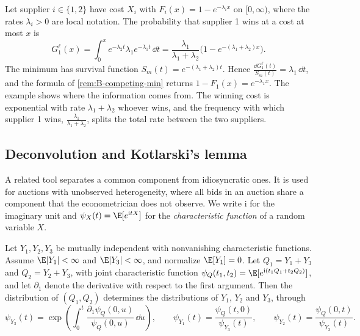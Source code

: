 \begin{example}\label{ex:B-competing-exp}
Let supplier $i \in \{1, 2\}$ have cost $X_i$ with $F_i(x) = 1 - e^{-\lambda_ix}$ on $[0, \infty)$, where the
rates $\lambda_i > 0$ are local notation. The probability that supplier 1 wins at a cost at most $x$ is
\begin{equation*}
  G_1^\ell(x) = \int_0^x e^{-\lambda_2t}\lambda_1e^{-\lambda_1t}\,\dd t
  = \frac{\lambda_1}{\lambda_1 + \lambda_2}\Big(1 - e^{-(\lambda_1 + \lambda_2)x}\Big).
\end{equation*}
The minimum has survival function $S_m(t) = e^{-(\lambda_1 + \lambda_2)t}$. Hence $\frac{\dd
G_1^\ell(t)}{S_m(t)} = \lambda_1\,\dd t$, and the formula of \cref{rem:B-competing-min} returns $1 - F_1(x) =
e^{-\lambda_1x}$. The example shows where the information comes from. The winning cost is exponential with
rate $\lambda_1 + \lambda_2$ whoever wins, and the frequency with which supplier 1 wins, $\frac{\lambda_1}
{\lambda_1 + \lambda_2}$, splits the total rate between the two suppliers.
\end{example}

\subsection{Deconvolution and Kotlarski's lemma}\label{sec:B-kotlarski}

A related tool separates a common component from idiosyncratic ones. It is used for auctions with
unobserved heterogeneity, where all bids in an auction share a component that the econometrician does not
observe. We write $\mathrm{i}$ for the imaginary unit and $\psi_X(t) = \E[e^{\mathrm{i}tX}]$ for the
\emph{characteristic function} of a random variable $X$.

\begin{lemma}[Kotlarski]\label{lem:B-kotlarski}
Let $Y_1, Y_2, Y_3$ be mutually independent with nonvanishing characteristic functions. Assume $\E|Y_1| <
\infty$ and $\E|Y_3| < \infty$, and normalize $\E[Y_1] = 0$. Let $Q_1 = Y_1 + Y_3$ and $Q_2 = Y_2 + Y_3$, with
joint characteristic function $\psi_Q(t_1, t_2) = \E[e^{\mathrm{i}(t_1Q_1 + t_2Q_2)}]$, and let $\partial_1$
denote the derivative with respect to the first argument. Then the distribution of $(Q_1, Q_2)$ determines
the distributions of $Y_1$, $Y_2$ and $Y_3$, through
\begin{equation}\label{eq:B-kotlarski}
  \psi_{Y_3}(t) = \exp\left(\int_0^t\frac{\partial_1\psi_Q(0, u)}{\psi_Q(0, u)}\,\dd u\right), \qquad
  \psi_{Y_1}(t) = \frac{\psi_Q(t, 0)}{\psi_{Y_3}(t)}, \qquad
  \psi_{Y_2}(t) = \frac{\psi_Q(0, t)}{\psi_{Y_3}(t)}.
\end{equation}
\end{lemma}

